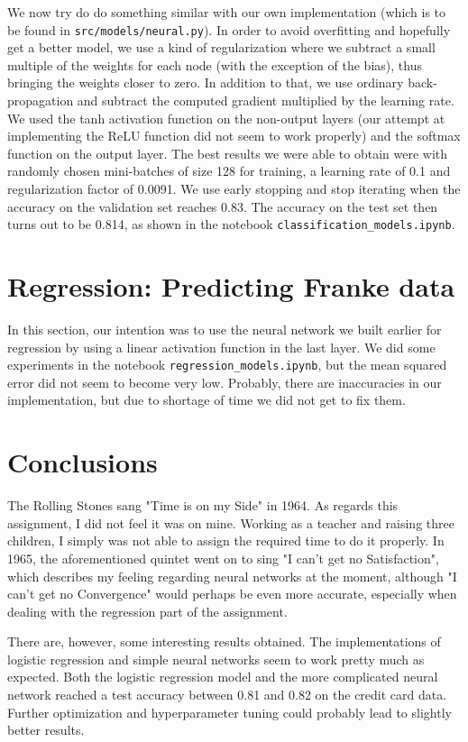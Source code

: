 \documentclass{article}
\begin{document}
We now try do do something similar with our own implementation (which is to be found in \texttt{src/models/neural.py}). In order to avoid overfitting and hopefully get a better model, we use a kind of regularization where we subtract a small multiple of the weights for each node (with the exception of the bias), thus bringing the weights closer to zero. In addition to that, we use ordinary back-propagation and subtract the computed gradient multiplied by the learning rate. We used the tanh activation function on the non-output layers (our attempt at implementing the ReLU function did not seem to work properly) and the softmax function on the output layer. The best results we were able to obtain were with randomly chosen mini-batches of size 128 for training, a learning rate of 0.1 and regularization factor of 0.0091. We use early stopping and stop iterating when the accuracy on the validation set reaches 0.83. The accuracy on the test set then turns out to be 0.814, as shown in the notebook \texttt{classification\_models.ipynb}.

\section{Regression: Predicting Franke data}
In this section, our intention was to use the neural network we built earlier for regression by using a linear activation function in the last layer. We did some experiments in the notebook \texttt{regression\_models.ipynb}, but the mean squared error did not seem to become very low. Probably, there are inaccuracies in our implementation, but due to shortage of time we did not get to fix them.

\section{Conclusions}
The Rolling Stones sang "Time is on my Side" in 1964. As regards this assignment, I did not feel it was on mine. Working as a teacher and raising three children, I simply was not able to assign the required time to do it properly. In 1965, the aforementioned quintet went on to sing "I can't get no Satisfaction", which describes my feeling regarding neural networks at the moment, although "I can't get no Convergence" would perhaps be even more accurate, especially when dealing with the regression part of the assignment.

There are, however, some interesting results obtained. The implementations of logistic regression and simple neural networks seem to work pretty much as expected. Both the logistic regression model and the more complicated neural network reached a test accuracy between 0.81 and 0.82 on the credit card data. Further optimization and hyperparameter tuning could probably lead to slightly better results.
\end{document}
